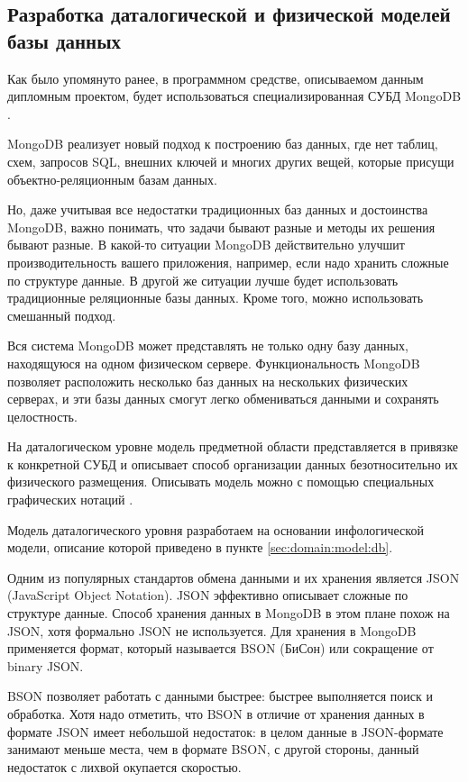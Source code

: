 \subsection{Разработка даталогической и физической моделей базы данных}
\label{sec:design:db}

Как было упомянуто ранее, в программном средстве, описываемом данным дипломным проектом, будет использоваться специализированная СУБД MongoDB \cite{mongo}.

MongoDB реализует новый подход к построению баз данных, где нет таблиц, схем, запросов SQL, внешних ключей и многих других вещей, которые присущи объектно-реляционным базам данных.

Но, даже учитывая все недостатки традиционных баз данных и достоинства MongoDB, важно понимать, что задачи бывают разные и методы их решения бывают разные. В какой-то ситуации MongoDB действительно улучшит производительность вашего приложения, например, если надо хранить сложные по структуре данные. В другой же ситуации лучше будет использовать традиционные реляционные базы данных. Кроме того, можно использовать смешанный подход.

\newpage

Вся система MongoDB может представлять не только одну базу данных, находящуюся на одном физическом сервере. Функциональность \linebreak MongoDB позволяет расположить несколько баз данных на нескольких физических серверах, и эти базы данных смогут легко обмениваться данными и сохранять целостность.

На даталогическом уровне модель предметной области представляется в привязке к конкретной СУБД и описывает способ организации данных безотносительно их физического размещения. Описывать модель можно с помощью специальных графических нотаций \cite{kulikov_db_workbook}. 

Модель даталогического уровня разработаем на основании инфологической модели, описание которой приведено в пункте \ref{sec:domain:model:db}. 

Одним из популярных стандартов обмена данными и их хранения является JSON (JavaScript Object Notation). JSON эффективно описывает сложные по структуре данные. Способ хранения данных в MongoDB в этом плане похож на JSON, хотя формально JSON не используется. Для хранения в MongoDB применяется формат, который называется BSON (БиСон) или сокращение от binary JSON.

BSON позволяет работать с данными быстрее: быстрее выполняется поиск и обработка. Хотя надо отметить, что BSON в отличие от хранения данных в формате JSON имеет небольшой недостаток: в целом данные в JSON-формате занимают меньше места, чем в формате BSON, с другой стороны, данный недостаток с лихвой окупается скоростью.

